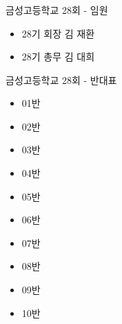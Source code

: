 \documentclass[aspectratio=1610,20pt,xcolor=pdftex,dvipsnames,table,handout]{beamer}
\begin{document}
		\begin{frame} [t,plain]
		\frametitle{ }
			\begin{block} {금성고등학교 28회 - 임원}
			\setlength{\leftmargini}{2em}			
			\begin{itemize}
				\item 28기 회장	\hrulefill 	김 재환
				\item 28기 총무	\hrulefill 	김 대희
			\end{itemize}
			\end{block}					

			\begin{block} {금성고등학교 28회 - 반대표}
			\setlength{\leftmargini}{2em}			
			\begin{itemize}
				\item 01반	\hrulefill 	
				\item 02반	\hrulefill 	
				\item 03반	\hrulefill 	
				\item 04반	\hrulefill 	
				\item 05반	\hrulefill 	
				\item 06반	\hrulefill 	
				\item 07반	\hrulefill 	
				\item 08반	\hrulefill 	
				\item 09반	\hrulefill 	
				\item 10반	\hrulefill 	
			\end{itemize}
			\end{block}						
	
		\end{frame}						
\end{document}
